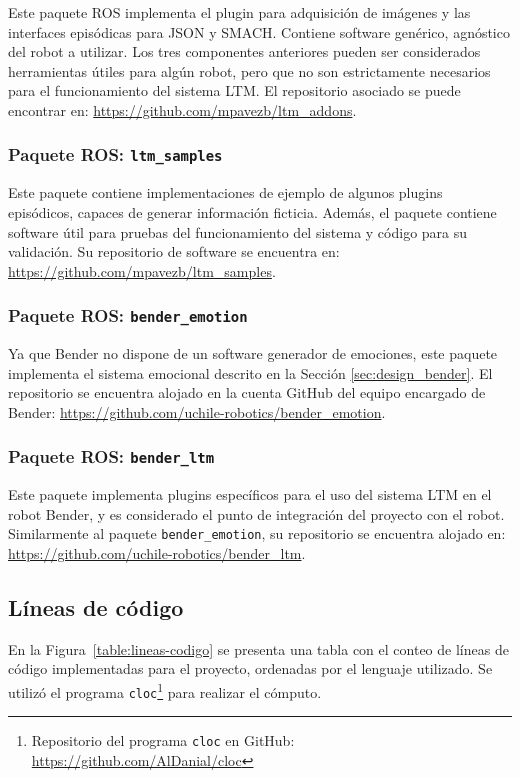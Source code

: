 Este paquete ROS implementa el plugin para adquisición de imágenes y las interfaces episódicas para JSON y SMACH. Contiene software genérico, agnóstico del robot a utilizar. Los tres componentes anteriores pueden ser considerados herramientas útiles para algún robot, pero que no son estrictamente necesarios para el funcionamiento del sistema LTM. El repositorio asociado se puede encontrar en: \url{https://github.com/mpavezb/ltm\_addons}.

\subsubsection{Paquete ROS: \texttt{ltm\_samples}}

Este paquete contiene implementaciones de ejemplo de algunos plugins episódicos, capaces de generar información ficticia. Además, el paquete contiene software útil para pruebas del funcionamiento del sistema y código para su validación. Su repositorio de software se encuentra en: \url{https://github.com/mpavezb/ltm\_samples}.

\subsubsection{Paquete ROS: \texttt{bender\_emotion}}

Ya que Bender no dispone de un software generador de emociones, este paquete implementa el sistema emocional descrito en la Sección \ref{sec:design_bender}. El repositorio se encuentra alojado en la cuenta GitHub del equipo encargado de Bender: \url{https://github.com/uchile-robotics/bender\_emotion}.

\subsubsection{Paquete ROS: \texttt{bender\_ltm}}

Este paquete implementa plugins específicos para el uso del sistema LTM en el robot Bender, y es considerado el punto de integración del proyecto con el robot. Similarmente al paquete \texttt{bender\_emotion}, su repositorio se encuentra alojado en: \url{https://github.com/uchile-robotics/bender\_ltm}.


\subsection{Líneas de código}

En la Figura~\ref{table:lineas-codigo} se presenta una tabla con el conteo de líneas de código implementadas para el proyecto, ordenadas por el lenguaje utilizado. Se utilizó el programa \texttt{cloc}\footnote{Repositorio del programa \texttt{cloc} en GitHub: \url{https://github.com/AlDanial/cloc}} para realizar el cómputo.

